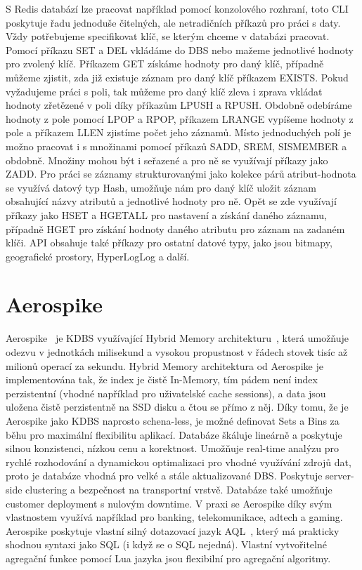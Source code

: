\documentclass[czech,master,dept460,male,csharp,cpdeclaration]{diploma}
\begin{document}
	S Redis databází lze pracovat například pomocí konzolového rozhraní, toto CLI~\cite{rediscli} poskytuje řadu jednoduše čitelných, ale netradičních příkazů pro práci s daty. Vždy potřebujeme specifikovat klíč, se kterým chceme v databázi pracovat. Pomocí příkazu SET a DEL vkládáme do DBS nebo mažeme jednotlivé hodnoty pro zvolený klíč. Příkazem GET získáme hodnoty pro daný klíč, případně můžeme zjistit, zda již existuje záznam pro daný klíč příkazem EXISTS. Pokud vyžadujeme práci s poli, tak můžeme pro daný klíč zleva i zprava vkládat hodnoty zřetězené v poli díky příkazům LPUSH a RPUSH. Obdobně odebíráme hodnoty z pole pomocí LPOP a RPOP, příkazem LRANGE vypíšeme hodnoty z pole a příkazem LLEN zjistíme počet jeho záznamů. Místo jednoduchých polí je možno pracovat i s množinami pomocí příkazů SADD, SREM, SISMEMBER a obdobně. Množiny mohou být i seřazené a pro ně se využívají příkazy jako ZADD. Pro práci se záznamy strukturovanými jako kolekce párů atribut-hodnota se využívá datový typ Hash, umožňuje nám pro daný klíč uložit záznam obsahující názvy atributů a jednotlivé hodnoty pro ně. Opět se zde využívají příkazy jako HSET a HGETALL pro nastavení a získání daného záznamu, případně HGET pro získání hodnoty daného atributu pro záznam na zadaném klíči. API obsahuje také příkazy pro ostatní datové typy, jako jsou bitmapy, geografické prostory, HyperLogLog a další.
	
	\section{Aerospike} \label{lab-aerospike}
	
	Aerospike~\cite{aerospike} je KDBS využívající Hybrid Memory architekturu~\cite{hybmem-arch}, která umožňuje odezvu v jednotkách milisekund a vysokou propustnost v řádech stovek tisíc až milionů operací za sekundu. Hybrid Memory architektura od Aerospike je implementována tak, že index je čistě In-Memory, tím pádem není index perzistentní (vhodné například pro uživatelské cache sessions), a data jsou uložena čistě perzistentně na SSD disku a čtou se přímo z něj. Díky tomu, že je Aerospike jako KDBS naprosto schena-less, je možné definovat Sets a Bins za běhu pro maximální flexibilitu aplikací. Databáze škáluje lineárně a poskytuje silnou konzistenci, nízkou cenu a korektnost. Umožňuje real-time analýzu pro rychlé rozhodování a dynamickou optimalizaci pro vhodné využívání zdrojů dat, proto je databáze vhodná pro velké a stále aktualizované DBS. Poskytuje server-side clustering a bezpečnost na transportní vrstvě. Databáze také umožňuje customer deployment s nulovým downtime. V praxi se Aerospike díky svým vlastnostem využívá například pro banking, telekomunikace, adtech a gaming. Aerospike poskytuje vlastní silný dotazovací jazyk AQL~\cite{aql}, který má prakticky shodnou syntaxi jako SQL (i když se o SQL nejedná). Vlastní vytvořitelné agregační funkce pomocí Lua jazyka jsou flexibilní pro agregační algoritmy.
	
\end{document}
